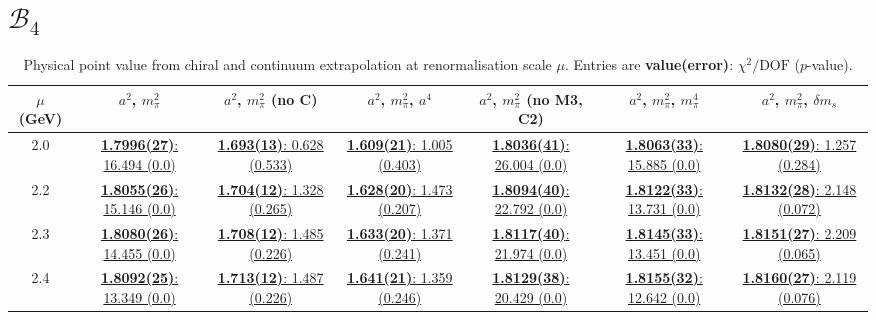 \documentclass[12pt]{extarticle}
\begin{document}
\section{$\mathcal{B}_4$}
\begin{table}[h!]
\begin{center}
\begin{tabular}{|c|c|c|c|c|c|c|}
\hline
$\mu$ (GeV) & $a^2$, $m_\pi^2$& $a^2$, $m_\pi^2$ (no C)& $a^2$, $m_\pi^2$, $a^4$& $a^2$, $m_\pi^2$ (no M3, C2)& $a^2$, $m_\pi^2$, $m_\pi^4$& $a^2$, $m_\pi^2$, $\delta m_s$\\
\hline
2.0& \hyperlink{SSpPP/SUSY/a2m2_20.pdf.1}{\textbf{1.7996(27)}: 16.494 (0.0)} & \hyperlink{SSpPP/SUSY/a2m2noC_20.pdf.1}{\textbf{1.693(13)}: 0.628 (0.533)} & \hyperlink{SSpPP/SUSY/a2a4m2_20.pdf.1}{\textbf{1.609(21)}: 1.005 (0.403)} & \hyperlink{SSpPP/SUSY/a2m2mcut_20.pdf.1}{\textbf{1.8036(41)}: 26.004 (0.0)} & \hyperlink{SSpPP/SUSY/a2m2m4_20.pdf.1}{\textbf{1.8063(33)}: 15.885 (0.0)} & \hyperlink{SSpPP/SUSY/a2m2delm_20.pdf.1}{\textbf{1.8080(29)}: 1.257 (0.284)}\\
2.2& \hyperlink{SSpPP/SUSY/a2m2_22.pdf.1}{\textbf{1.8055(26)}: 15.146 (0.0)} & \hyperlink{SSpPP/SUSY/a2m2noC_22.pdf.1}{\textbf{1.704(12)}: 1.328 (0.265)} & \hyperlink{SSpPP/SUSY/a2a4m2_22.pdf.1}{\textbf{1.628(20)}: 1.473 (0.207)} & \hyperlink{SSpPP/SUSY/a2m2mcut_22.pdf.1}{\textbf{1.8094(40)}: 22.792 (0.0)} & \hyperlink{SSpPP/SUSY/a2m2m4_22.pdf.1}{\textbf{1.8122(33)}: 13.731 (0.0)} & \hyperlink{SSpPP/SUSY/a2m2delm_22.pdf.1}{\textbf{1.8132(28)}: 2.148 (0.072)}\\
2.3& \hyperlink{SSpPP/SUSY/a2m2_23.pdf.1}{\textbf{1.8080(26)}: 14.455 (0.0)} & \hyperlink{SSpPP/SUSY/a2m2noC_23.pdf.1}{\textbf{1.708(12)}: 1.485 (0.226)} & \hyperlink{SSpPP/SUSY/a2a4m2_23.pdf.1}{\textbf{1.633(20)}: 1.371 (0.241)} & \hyperlink{SSpPP/SUSY/a2m2mcut_23.pdf.1}{\textbf{1.8117(40)}: 21.974 (0.0)} & \hyperlink{SSpPP/SUSY/a2m2m4_23.pdf.1}{\textbf{1.8145(33)}: 13.451 (0.0)} & \hyperlink{SSpPP/SUSY/a2m2delm_23.pdf.1}{\textbf{1.8151(27)}: 2.209 (0.065)}\\
2.4& \hyperlink{SSpPP/SUSY/a2m2_24.pdf.1}{\textbf{1.8092(25)}: 13.349 (0.0)} & \hyperlink{SSpPP/SUSY/a2m2noC_24.pdf.1}{\textbf{1.713(12)}: 1.487 (0.226)} & \hyperlink{SSpPP/SUSY/a2a4m2_24.pdf.1}{\textbf{1.641(21)}: 1.359 (0.246)} & \hyperlink{SSpPP/SUSY/a2m2mcut_24.pdf.1}{\textbf{1.8129(38)}: 20.429 (0.0)} & \hyperlink{SSpPP/SUSY/a2m2m4_24.pdf.1}{\textbf{1.8155(32)}: 12.642 (0.0)} & \hyperlink{SSpPP/SUSY/a2m2delm_24.pdf.1}{\textbf{1.8160(27)}: 2.119 (0.076)}\\
\hline
\end{tabular}
\caption{Physical point value from chiral and continuum extrapolation at renormalisation scale $\mu$. Entries are \textbf{value(error)}: $\chi^2/\text{DOF}$ ($p$-value).}
\end{center}
\end{table}
\end{document}
